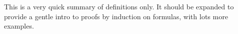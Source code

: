 \documentclass[../../../include/open-logic-chapter]{subfiles}
\begin{document}

\begin{editorial}
  This is a very quick summary of definitions only. It should be
  expanded to provide a gentle intro to proofs by induction on
  formulas, with lots more examples.
\end{editorial}






\OLEndChapterHook
\end{document}
